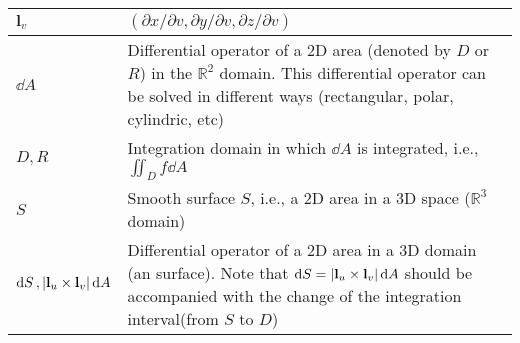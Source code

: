 \begin{xltabular}{\textwidth}{XX}
	\(\mathbf{l}_v\)                                                                                                                                                                                                                           & \((\partial x/ \partial v, \partial y/ \partial v, \partial z/ \partial v)\)                                                                                                                                                                                                                                                        \\ \hline
	\(\dd{A}\)                                                                                                                                                                                                                                 & Differential operator of a 2D area (denoted by \(D\) or \(R\)) in the \(\mathbb{R}^2\) domain. This differential operator can be solved in different ways (rectangular, polar, cylindric, etc) \cite{stewartCalculus2011}                                                                                                           \\ \hline
	\(D, R\)                                                                                                                                                                                                                                   & Integration domain in which \(\dd{A}\) is integrated, i.e., \(\iint_D f \dd{A}\) \cite{stewartCalculus2011}                                                                                                                                                                                                                         \\ \hline
	\(S\)                                                                                                                                                                                                                                      & Smooth surface \(S\), i.e., a 2D area in a 3D space (\(\mathbb{R}^3\) domain)                                                                                                                                                                                                                                                       \\ \hline
	\(\dd{S}, \abs{\mathbf{l}_u\times\mathbf{l}_v} \dd{A} \)                                                                                                                                                                                   & Differential operator of a 2D area in a 3D domain (an surface). Note that \(\dd{S} = \abs{\mathbf{l}_u\times\mathbf{l}_v} \dd{A}\) should be accompanied with the change of the integration interval(from \(S\) to \(D\))                                                                                                           \\ \hline

\end{xltabular}
